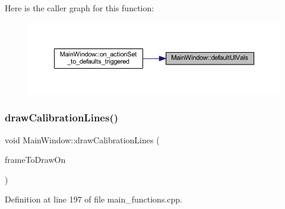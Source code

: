 Here is the caller graph for this function\+:
\nopagebreak
\begin{figure}[H]
\begin{center}
\leavevmode
\includegraphics[width=350pt]{class_main_window_a6021f4624cf5aa8ced6b210d388ac31d_icgraph}
\end{center}
\end{figure}
\mbox{\label{class_main_window_a46d10bf790a404b85083416112d51c08}} 
\subsubsection{\texorpdfstring{drawCalibrationLines()}{drawCalibrationLines()}}
{\footnotesize\ttfamily void Main\+Window\+::draw\+Calibration\+Lines (\begin{DoxyParamCaption}\item[{Q\+Pixmap $\ast$}]{frame\+To\+Draw\+On }\end{DoxyParamCaption})\hspace{0.3cm}{\ttfamily [private]}}



Definition at line 197 of file main\+\_\+functions.\+cpp.

